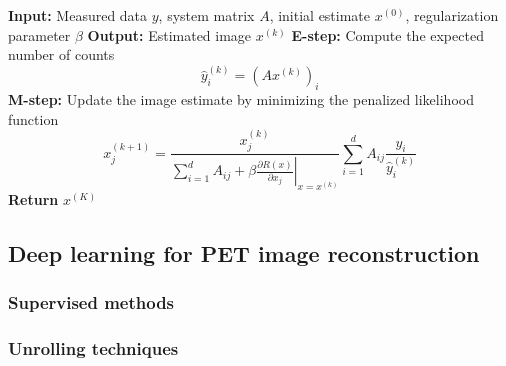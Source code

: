 \begin{algorithm}
\caption{Maximum A Posteriori Expectation-Maximization (MAPEM)}
\begin{algorithmic}[1]
\State \textbf{Input:} Measured data $y$, system matrix $A$, initial estimate $x^{(0)}$, regularization parameter $\beta$
\State \textbf{Output:} Estimated image $x^{(k)}$
    \State \textbf{E-step:} Compute the expected number of counts
    \begin{equation*}
        \hat{y}_i^{(k)} = (Ax^{(k)})_i
    \end{equation*}
    \State \textbf{M-step:} Update the image estimate by minimizing the penalized likelihood function
    \begin{equation*}
        x_j^{(k+1)} = \frac{x_j^{(k)}}{\displaystyle \sum_{i=1}^{d} A_{ij} + \beta \left.\frac{\partial R(x)}{\partial x_j}\right|_{x=x^{(k)}}}  \sum_{i=1}^{d} A_{ij} \frac{y_i}{\hat{y}_i^{(k)}}
    \end{equation*}
\EndFor
\State \textbf{Return} $x^{(K)}$
\end{algorithmic}
\label{alg:mapem}
\end{algorithm}


\subsection{Deep learning for PET image reconstruction}

\subsubsection{Supervised methods}
\subsubsection{Unrolling techniques}